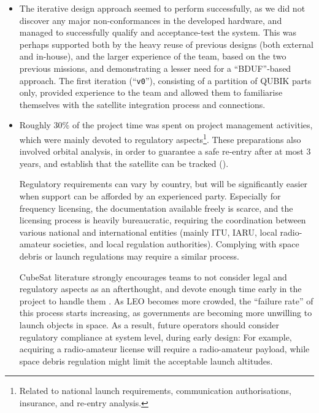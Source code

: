 \documentclass[a4paper,nobib,justified,final]{tufte-book}
\begin{document}
\begin{itemize}
	\item The iterative design approach seemed to perform successfully, as we did not discover any major non-conformances in the developed hardware, and managed to successfully qualify and acceptance-test the system. This was perhaps supported both by the heavy reuse of previous designs (both external and in-house), and the larger experience of the team, based on the two previous missions, and demonstrating a lesser need for a ``\acl{BDUF}''-based approach. The first iteration (``\texttt{v0}''), consisting of a partition of QUBIK parts only, provided experience to the team and allowed them to familiarise themselves with the satellite integration process and connections.
	\item Roughly 30\% of the project time was spent on project management activities, which were mainly devoted to regulatory aspects\footnote{Related to national launch requirements, communication authorisations, insurance, and re-entry analysis.}. These preparations also involved orbital analysis, in order to guarantee a safe re-entry after at most 3 years, and establish that the satellite can be tracked ().
	
	Regulatory requirements can vary by country, but will be significantly easier when support can be afforded by an experienced party. Especially for frequency licensing, the documentation available freely is scarce, and the licensing process is heavily bureaucratic, requiring the coordination between various national and international entities (mainly \acs{ITU}, \acs{IARU}, local radio-amateur societies, and local regulation authorities). Complying with space debris or launch regulations may require a similar process.

	CubeSat literature strongly encourages teams to not consider legal and regulatory aspects as an afterthought, and devote enough time early in the project to handle them \autocite{kinnairdSelectionLessonsLearned2022}. As \ac{LEO} becomes more crowded, the ``failure rate'' of this process starts increasing, as governments are becoming more unwilling to launch objects in space. As a result, future operators should consider regulatory compliance at system level, during early design: For example, acquiring a radio-amateur license will require a radio-amateur payload, while space debris regulation might limit the acceptable launch altitudes.
\end{itemize}
\end{document}
